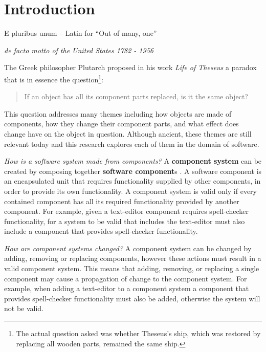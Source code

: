 \chapter{Introduction}
\label{introduction}
\epigraph{E pluribus unum -- Latin for ``Out of many, one''}
{\textit{de facto motto of the United States 1782 - 1956}}
The Greek philosopher Plutarch proposed in his work \textit{Life of Theseus} a paradox that is in essence the question\footnote{The actual question asked was whether Theseus's ship, which was restored by replacing all wooden parts, remained the same ship.}:
\begin{quote}
If an object has all its component parts replaced, is it the same object?
\end{quote}
This question addresses many themes including how objects are made of components, how they change their component parts,
and what effect does change have on the object in question.
Although ancient, 
these themes are still relevant today and this research explores each of them in the domain of software.

\textit{How is a software system made from components?}
A \textbf{component system} can be created by composing together \textbf{software component}s \citep{Szyperski2002}.
A software component is an encapsulated unit that requires functionality supplied by other components, in order to provide its own functionality. 
A component system is valid only if every contained component has all its required functionality provided by another component.
For example, given a text-editor component requires spell-checker functionality, 
for a system to be valid that includes the text-editor must also include a component that provides spell-checker functionality.


\textit{How are component systems changed?}
A component system can be changed by adding, removing or replacing components, however these actions must result in a valid component system.
This means that adding, removing, or replacing a single component may cause a propagation of change to the component system.
For example, when adding a text-editor to a component system 
a component that provides spell-checker functionality must also be added, otherwise the system will not be valid.

